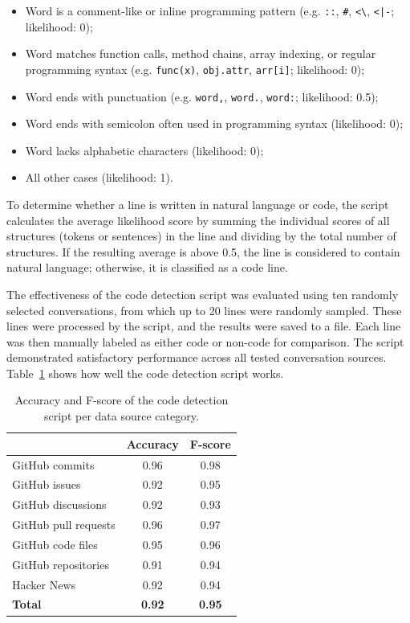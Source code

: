 \begin{itemize}
\begin{itemize}
        \item Word is a comment-like or inline programming pattern (e.g. \texttt{::}, \texttt{\#}, \texttt{<\textbackslash }, \texttt{<|-};  likelihood: 0);
        \item Word matches function calls, method chains, array indexing, or regular programming syntax (e.g. \texttt{func(x)}, \texttt{obj.attr}, \texttt{arr[i]}; likelihood: 0);
        \item Word ends with punctuation (e.g. \texttt{word,}, \texttt{word.}, \texttt{word:}; likelihood: 0.5);
        \item Word ends with semicolon often used in programming syntax (likelihood: 0);
        \item Word lacks alphabetic characters (likelihood: 0);
        \item All other cases (likelihood: 1).
    \end{itemize}
\end{itemize}

To determine whether a line is written in natural language or code, the script calculates the average likelihood score by summing the individual scores of all structures (tokens or sentences) in the line and dividing by the total number of structures. If the resulting average is above 0.5, the line is considered to contain natural language; otherwise, it is classified as a code line.

The effectiveness of the code detection script was evaluated using ten randomly selected conversations, from which up to 20 lines were randomly sampled. These lines were processed by the script, and the results were saved to a file. Each line was then manually labeled as either code or non-code for comparison. The script demonstrated satisfactory performance across all tested conversation sources. Table~\ref{table:script-accuracy} shows how well the code detection script works.

\begin{table}[h]
    \centering
    \begin{tabular}{|l|c|c|}
        \hline
        & Accuracy & F-score  \\
        \hline
        GitHub commits & 0.96 & 0.98 \\
        \hline
        GitHub issues & 0.92 & 0.95 \\
        \hline
        GitHub discussions & 0.92 & 0.93 \\
        \hline
        GitHub pull requests & 0.96 & 0.97  \\
        \hline
        GitHub code files & 0.95 & 0.96  \\
        \hline
        GitHub repositories & 0.91 & 0.94  \\
        \hline
        Hacker News & 0.92 & 0.94  \\
        \hline
        \textbf{Total} & \textbf{0.92} & \textbf{0.95}  \\
        \hline
    \end{tabular}
    \caption{Accuracy and F-score of the code detection script per data source category.}
    \label{table:script-accuracy}
\end{table}

